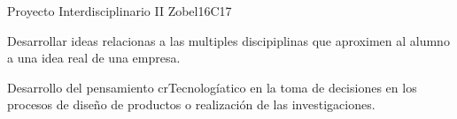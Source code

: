 \begin{syllabus}
\begin{unit}{Proyecto Interdisciplinario II }{}{Zobel}{16}{C17}
\begin{topics}
      \item Desarrollar ideas relacionas a las multiples discipiplinas  que aproximen al alumno a una idea real de una empresa.
\end{topics}

\begin{learningoutcomes}
   \item Desarrollo del pensamiento crTecnologíatico en la toma de decisiones en los procesos de diseño de productos o realización de las investigaciones.
\end{learningoutcomes}
\end{unit}

\begin{coursebibliography}
\end{coursebibliography}

\end{syllabus}
